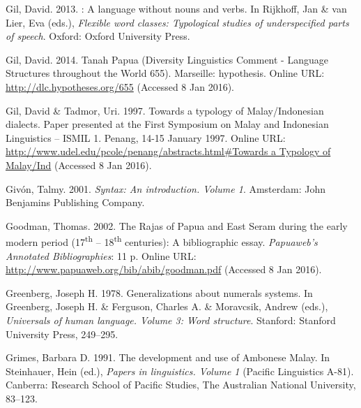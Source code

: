 \begin{styleCitaviBibliographyEntry}
Gil, David. 2013. : A language without nouns and verbs. In Rijkhoff, Jan \& van Lier, Eva (eds.), \textit{Flexible word classes: Typological studies of underspecified parts of speech}. Oxford: Oxford University Press.
\end{styleCitaviBibliographyEntry}

\begin{styleCitaviBibliographyEntry}
Gil, David. 2014. Tanah Papua (Diversity Linguistics Comment - Language Structures throughout the World 655). Marseille: hypothesis. Online URL: \url{http://dlc.hypotheses.org/655} (Accessed 8 Jan 2016).
\end{styleCitaviBibliographyEntry}

\begin{styleCitaviBibliographyEntry}
Gil, David \& Tadmor, Uri. 1997. Towards a typology of Malay/Indonesian dialects. Paper presented at the First Symposium on Malay and Indonesian Linguistics – ISMIL 1. Penang, 14-15 January 1997. Online URL: \url{http://www.udel.edu/pcole/penang/abstracts.html#Towards a Typology of Malay/Ind} (Accessed 8 Jan 2016).
\end{styleCitaviBibliographyEntry}

\begin{styleCitaviBibliographyEntry}
Givón, Talmy. 2001. \textit{Syntax: An introduction. Volume 1}. Amsterdam: John Benjamins Publishing Company.
\end{styleCitaviBibliographyEntry}

\begin{styleCitaviBibliographyEntry}
Goodman, Thomas. 2002. The Rajas of Papua and East Seram during the early modern period (17\textsuperscript{th} – 18\textsuperscript{th} centuries): A bibliographic essay. \textit{Papuaweb’s Annotated Bibliographies}: 11 p. Online URL: \url{http://www.papuaweb.org/bib/abib/goodman.pdf} (Accessed 8 Jan 2016).
\end{styleCitaviBibliographyEntry}

\begin{styleCitaviBibliographyEntry}
Greenberg, Joseph H. 1978. Generalizations about numerals systems. In Greenberg, Joseph H. \& Ferguson, Charles A. \& Moravcsik, Andrew (eds.), \textit{Universals of human language. Volume 3: Word structure}. Stanford: Stanford University Press, 249–295.
\end{styleCitaviBibliographyEntry}

\begin{styleCitaviBibliographyEntry}
Grimes, Barbara D. 1991. The development and use of Ambonese Malay. In Steinhauer, Hein (ed.), \textit{Papers in  linguistics. Volume 1} (Pacific Linguistics A-81). Canberra: Research School of Pacific Studies, The Australian National University, 83–123.
\end{styleCitaviBibliographyEntry}

